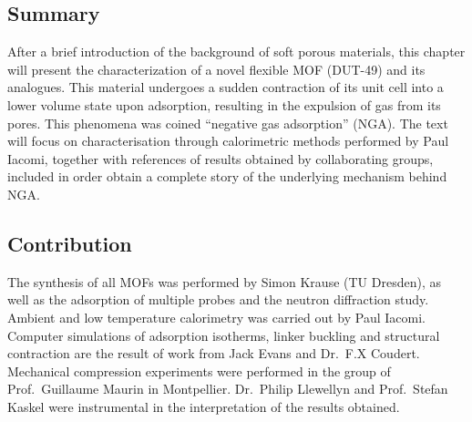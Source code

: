 \subsection*{Summary}

After a brief introduction of the background of soft porous 
materials, this chapter will present the characterization of a novel
flexible MOF (DUT-49) and its analogues. This material undergoes
a sudden contraction of its unit cell into a lower volume state
upon adsorption, resulting in the expulsion of gas from its pores.
This phenomena was coined ``negative gas adsorption'' (NGA).
The text will focus on characterisation through calorimetric methods
performed by Paul Iacomi, together with references
of results obtained by collaborating groups, included in order
obtain a complete story of the underlying mechanism behind NGA.

\subsection*{Contribution}

The synthesis of all MOFs was performed by Simon Krause
(TU Dresden), as well as the adsorption of multiple probes 
and the neutron diffraction study.
Ambient and low temperature calorimetry was carried out by 
Paul Iacomi. Computer simulations of adsorption isotherms, 
linker buckling and structural contraction
are the result of work from Jack Evans and Dr.\ F.X Coudert.
Mechanical compression experiments were performed in 
the group of Prof.\ Guillaume Maurin in Montpellier.
Dr.\ Philip Llewellyn and Prof.\ Stefan Kaskel were 
instrumental in the interpretation of the results obtained.
